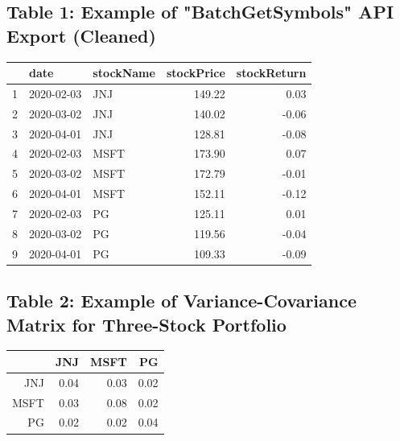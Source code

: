 \documentclass[12pt,english]{article}
\begin{document}
        \subsection{Table 1: Example of "BatchGetSymbols" API Export (Cleaned)}        
            \begin{center}
                \begin{table}[H]
                \centering
                \begin{tabular}{rllrr}
                  \hline
                 & date & stockName & stockPrice & stockReturn \\ 
                  \hline
                1 & 2020-02-03 & JNJ & 149.22 & 0.03 \\ 
                  2 & 2020-03-02 & JNJ & 140.02 & -0.06 \\ 
                  3 & 2020-04-01 & JNJ & 128.81 & -0.08 \\ 
                  4 & 2020-02-03 & MSFT & 173.90 & 0.07 \\ 
                  5 & 2020-03-02 & MSFT & 172.79 & -0.01 \\ 
                  6 & 2020-04-01 & MSFT & 152.11 & -0.12 \\ 
                  7 & 2020-02-03 & PG & 125.11 & 0.01 \\ 
                  8 & 2020-03-02 & PG & 119.56 & -0.04 \\ 
                  9 & 2020-04-01 & PG & 109.33 & -0.09 \\ 
                   \hline
                \end{tabular}
                \end{table}
            \end{center}
        
        \subsection{Table 2: Example of Variance-Covariance Matrix for Three-Stock Portfolio} 
                \begin{table}[H]
                \centering
                \begin{tabular}{rrrr}
                \hline
                 & JNJ & MSFT & PG \\ 
                \hline
                JNJ & 0.04 & 0.03 & 0.02 \\ 
                  MSFT & 0.03 & 0.08 & 0.02 \\ 
                  PG & 0.02 & 0.02 & 0.04 \\ 
                \hline
                \end{tabular}
                \end{table}
        
\end{document}
